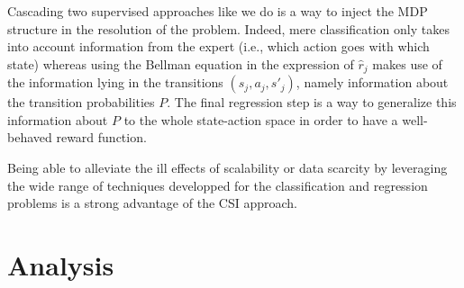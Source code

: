 \documentclass[smallextended]{svjour3}
\begin{document}
Cascading two supervised approaches like we do is a way to inject the MDP structure in the resolution of the problem. Indeed, mere classification only takes into account information from the expert (i.e., which action goes with which state) whereas using the Bellman equation in the expression of $\hat r_j$ makes use of the information lying in the transitions $(s_j,a_j,s'_j)$, namely information about the transition probabilities $P$. The final regression step is a way to generalize this information about $P$ to the whole state-action space in order to have a well-behaved reward function.

Being able to alleviate the ill effects of scalability or data scarcity by leveraging the wide range of techniques developped for the classification and regression problems is a strong advantage of the CSI approach.

\section{Analysis}
\label{sec:analysis}
\end{document}
